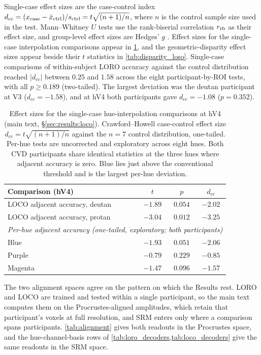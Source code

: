 Single-case effect sizes are the case-control index $d_{cc} = (x_{\rm case} - \bar{x}_{\rm ctrl}) / s_{\rm ctrl} = t\sqrt{(n+1)/n}$, where $n$ is the control sample size used in the test. Mann--Whitney $U$ tests use the rank-biserial correlation $r_{\rm rb}$ as their effect size, and group-level effect sizes are Hedges' $g$ \parencite{hedges1985}. Effect sizes for the single-case interpolation comparisons appear in \cref{tab:effect_sizes}, and the geometric-disparity effect sizes appear beside their $t$ statistics in \cref{tab:disparity_loso}. Single-case comparisons of within-subject LORO accuracy against the control distribution reached $|d_{cc}|$ between $0.25$ and $1.58$ across the eight participant-by-ROI tests, with all $p \geq 0.189$ (two-tailed). The largest deviation was the deutan participant at V3 ($d_{cc} = -1.58$), and at hV4 both participants gave $d_{cc} = -1.08$ ($p = 0.352$).

\begin{table}[h]
\centering
\caption{Effect sizes for the single-case hue-interpolation comparisons at hV4 (main text, \S\ref{sec:results:loco}). Crawford--Howell case-control effect size $d_{cc} = t\sqrt{(n+1)/n}$ against the $n = 7$ control distribution, one-tailed. Per-hue tests are uncorrected and exploratory across eight hues. Both CVD participants share identical statistics at the three hues where adjacent accuracy is zero. Blue lies just above the conventional threshold and is the largest per-hue deviation.}
\label{tab:effect_sizes}
\begin{tabular}{lccc}
\toprule
Comparison (hV4) & $t$ & $p$ & $d_{cc}$ \\
\midrule
LOCO adjacent accuracy, deutan & $-1.89$ & $0.054$ & $-2.02$ \\
LOCO adjacent accuracy, protan & $-3.04$ & $0.012$ & $-3.25$ \\
\midrule
\multicolumn{4}{l}{\emph{Per-hue adjacent accuracy (one-tailed, exploratory; both participants)}} \\
Blue & $-1.93$ & $0.051$ & $-2.06$ \\
Purple & $-0.79$ & $0.229$ & $-0.85$ \\
Magenta & $-1.47$ & $0.096$ & $-1.57$ \\
\bottomrule
\end{tabular}
\end{table}



The two alignment spaces agree on the pattern on which the Results rest. LORO and LOCO are trained and tested within a single participant, so the main text computes them on the Procrustes-aligned amplitudes, which retain that participant's voxels at full resolution, and SRM enters only where a comparison spans participants. \cref{tab:alignment} gives both readouts in the Procrustes space, and the hue-channel-basis rows of \cref{tab:loro_decoders,tab:loco_decoders} give the same readouts in the SRM space.

